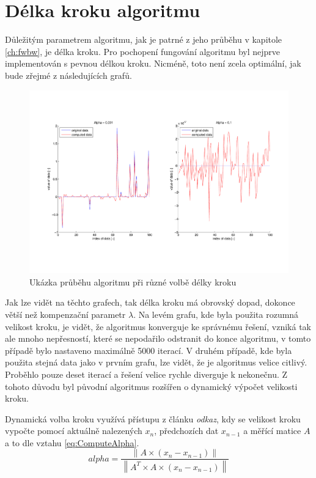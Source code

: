 \documentclass[FM,BP]{tulthesis}
\newcounter{Vzorce}
\begin{document}
\section{Délka kroku algoritmu}
Důležitým parametrem algoritmu, jak je patrné z jeho průběhu v kapitole \ref{ch:fwbw}, je délka kroku. Pro pochopení fungování algoritmu byl nejprve implementován s pevnou délkou kroku. Nicméně, toto není zcela optimální, jak bude zřejmé z následujících grafů.
\begin{figure}[!ht]
\begin{center}
\includegraphics[scale=0.5]{obr/basic.pdf}
\end{center}
\caption{Ukázka průběhu algoritmu při různé volbě délky kroku}
\label{fig:basicAlpha}
\end{figure} 

Jak lze vidět na těchto grafech, tak délka kroku má obrovský dopad, dokonce větší než kompenzační parametr $\lambda$. Na levém grafu, kde byla použita rozumná velikost kroku, je vidět, že algoritmus konverguje ke správnému řešení, vzniká tak ale mnoho nepřesností, které se nepodařilo odstranit do konce algoritmu, v tomto případě bylo nastaveno maximálně 5000 iterací. V druhém případě, kde byla použita stejná data jako v prvním grafu, lze vidět, že je algoritmus velice citlivý. Proběhlo pouze deset iterací a řešení velice rychle diverguje k nekonečnu. Z tohoto důvodu byl původní algoritmus rozšířen o dynamický výpočet velikosti kroku.

Dynamická volba kroku využívá přístupu z článku \textit{odkaz}, kdy se velikost kroku vypočte pomocí aktuálně nalezených $x_{n}$, předchozích dat $x_{n-1}$ a měřící matice $A$ a to dle vztahu \ref{eq:ComputeAlpha}.
\begin{equation} \label{eq:ComputeAlpha}  \tag{Vzorec \theVzorce}
alpha = \frac{\left\| A \times (x_{n} - x_{n-1}) \right\|}{\left\| A^{T} \times A \times (x_{n} - x_{n-1}) \right\| }
\end{equation}
\end{document}
